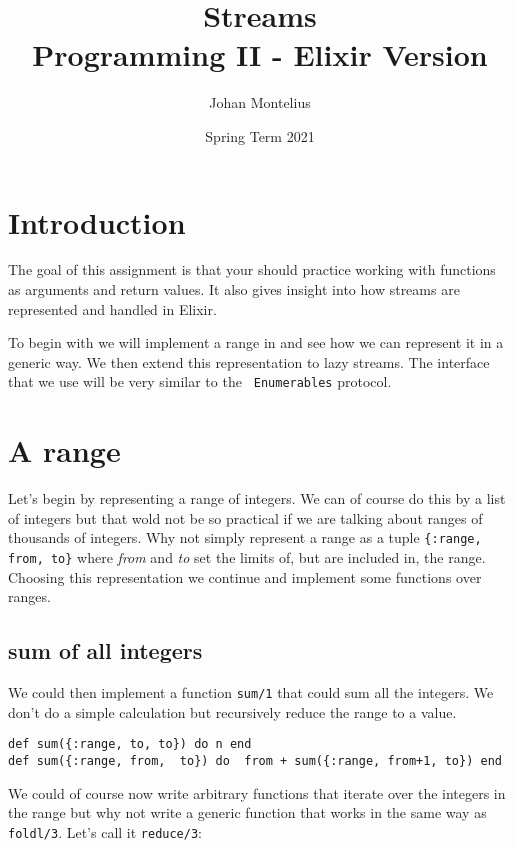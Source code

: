 \documentclass[a4paper,11pt]{article}
\begin{document}
\title{
    \textbf{Streams }\\
    \large{Programming II - Elixir Version}
}
\author{Johan Montelius}
\date{Spring Term 2021}
\maketitle
\thispagestyle{fancy}


\section*{Introduction}

The goal of this assignment is that your should practice working with
functions as arguments and return values. It also gives insight into
how streams are represented and handled in Elixir.

To begin with we will implement a range in and see how we can represent
it in a generic way. We then extend this representation to lazy
streams. The interface that we use will be very similar to the {\tt
  Enumerables} protocol.


\section{A range}

Let's begin by representing a range of integers. We can of course do
this by a list of integers but that wold not be so practical if we are
talking about ranges of thousands of integers. Why not simply
represent a range as a tuple {\tt \{:range, from, to\}} where {\em
  from} and {\em to} set the limits of, but are included in, the
range. Choosing this representation we continue and implement some
functions over ranges.

\subsection{sum of all integers}


We could then implement a function {\tt sum/1} that could sum all the
integers. We don't do a simple calculation but recursively reduce the
range to a value. 

\begin{verbatim}
def sum({:range, to, to}) do n end  
def sum({:range, from,  to}) do  from + sum({:range, from+1, to}) end  
\end{verbatim}

We could of course now write arbitrary functions that iterate over the
integers in the range but why not write a generic function that works
in the same way as {\tt foldl/3}. Let's call it {\tt reduce/3}:
\end{document}
